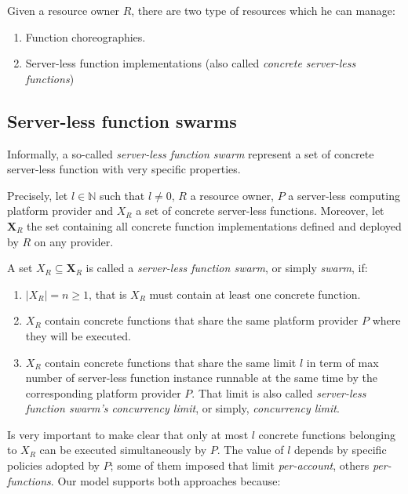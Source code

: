\documentclass[10pt,a4paper]{article}
\theoremstyle{definition}
\begin{document}
Given a resource owner $R$, there are two type of resources which he can manage:

\begin{enumerate}
\item Function choreographies.
\item Server-less function implementations (also called \textit{concrete server-less functions})
\end{enumerate}



\subsection{Server-less function swarms}

Informally, a so-called \textit{server-less function swarm} represent a set of concrete server-less function with very specific properties.

Precisely, let $l \in \mathbb{N}$ such that $l \neq 0$, $R$ a resource owner, $P$ a server-less computing platform provider and  $X_R$ a set of concrete server-less functions. Moreover, let $\textbf{X}_R$ the set containing all concrete function implementations defined and deployed by $R$ on any provider. 

A set $X_R \subseteq \textbf{X}_R$ is called a \textit{server-less function swarm}, or simply \textit{swarm}, if:

\begin{enumerate}
\item $|X_{R}| = n \geq 1$, that is $X_{R}$ must contain at least one concrete function.
\item $X_{R}$ contain concrete functions that share the same platform provider $P$ where they will be executed.
\item $X_{R}$ contain concrete functions that share the same limit $l$ in term of max number of server-less function instance runnable at the same time by the corresponding platform provider $P$. That limit is also called \textit{server-less function swarm's concurrency limit}, or simply, \textit{concurrency limit}. 
\end{enumerate}

Is very important to make clear that only at most $l$ concrete functions belonging to $X_R$ can be executed simultaneously by $P$. The value of $l$ depends by specific policies adopted by $P$; some of them imposed that limit \textit{per-account}, others \textit{per-functions}. Our model supports both approaches because:
\end{document}
